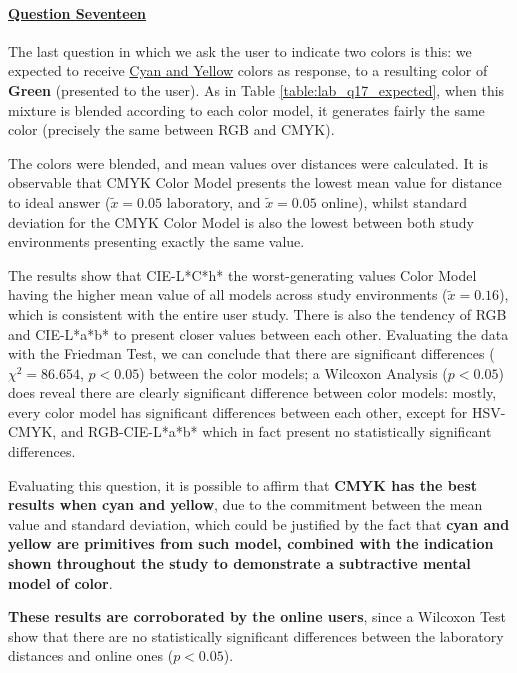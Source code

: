 \paragraph{\ul{Question Seventeen}}
%
The last question in which we ask the user to indicate two colors is this: we expected to receive \ul{Cyan and Yellow} colors as response, to a resulting color of \textbf{Green}
(presented to the user). As in Table \ref{table:lab_q17_expected}, when this mixture is blended according to each color model, it generates fairly the same color (precisely the same between
RGB and CMYK). \par
%
The colors were blended, and mean values over distances were calculated. It is observable that CMYK Color Model presents the lowest mean value for distance to ideal answer ($\tilde{x} = 0.05$
laboratory, and $\tilde{x} = 0.05$ online), whilst standard deviation for the CMYK Color Model is also the lowest between both study environments presenting exactly the same value. \par
%
The results show that CIE-L*C*h* the worst-generating values Color Model having the higher mean value of all models across study environments ($\tilde{x} = 0.16$), which is consistent with the
entire user study. There is also the tendency of RGB and CIE-L*a*b* to present closer values between each other. Evaluating the data with the Friedman Test, we can conclude that there are significant
differences ($\chi^2 = 86.654$, $p < 0.05$) between the color models; a Wilcoxon Analysis ($p < 0.05$) does reveal there are clearly significant difference between color models: mostly, every color model
has significant differences between each other, except for HSV-CMYK, and RGB-CIE-L*a*b* which in fact present no statistically significant differences. \par
%
Evaluating this question, it is possible to affirm that \textbf{CMYK has the best results when cyan and yellow}, due to the commitment between the mean value and standard deviation, which
could be justified by the fact that \textbf{cyan and yellow are primitives from such model, combined with the indication shown throughout the study to demonstrate a subtractive mental model of color}. \par
%
\textbf{These results are corroborated by the online users}, since a Wilcoxon Test show that there are no statistically significant differences between the laboratory distances and online ones ($p < 0.05$).
%
